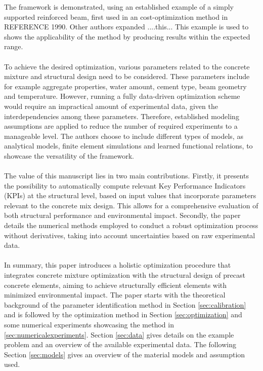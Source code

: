 The framework is demonstrated, using an established example of a simply supported reinforced beam, first used in an cost-optimization method in REFERENCE 1990.
Other authors expanded ....this...
This example is used to shows the applicability of the method by producing results within the expected range.\\\\
%
To achieve the desired optimization, various parameters related to the concrete mixture and structural design need to be considered.
These parameters include for example aggregate properties, water amount, cement type, beam geometry and temperature. 
However, running a fully data-driven optimization scheme would require an impractical amount of experimental data, given the interdependencies among these parameters. 
Therefore, established modeling assumptions are applied to reduce the number of required experiments to a manageable level.
The authors choose to include different types of models, as analytical models, finite element simulations and learned functional relations, to showcase the versatility of the framework.
\\\\
%
The value of this manuscript lies in two main contributions. 
Firstly, it presents the possibility to automatically compute relevant Key Performance Indicators (KPIs) at the structural level, based on input values that incorporate parameters relevant to the concrete mix design. 
This allows for a comprehensive evaluation of both structural performance and environmental impact. 
Secondly, the paper details the numerical methods employed to conduct a robust optimization process without derivatives, taking into account uncertainties based on raw experimental data.\\\\
In summary, this paper introduces a holistic optimization procedure that integrates concrete mixture optimization with the structural design of precast concrete elements, aiming to achieve structurally efficient elements with minimized environmental impact. 
The paper starts  with the theoretical background of the parameter identification method in Section \ref{sec:calibration} and is followed by the optimization method in Section \ref{sec:optimization} and some numerical experiments showcasing the method in \ref{sec:numericalexperiments}.
Section \ref{sec:data} gives details on the example problem and an overview of the available experimental data.
The following Section \ref{sec:models} gives an overview of the material models and assumption used. 
